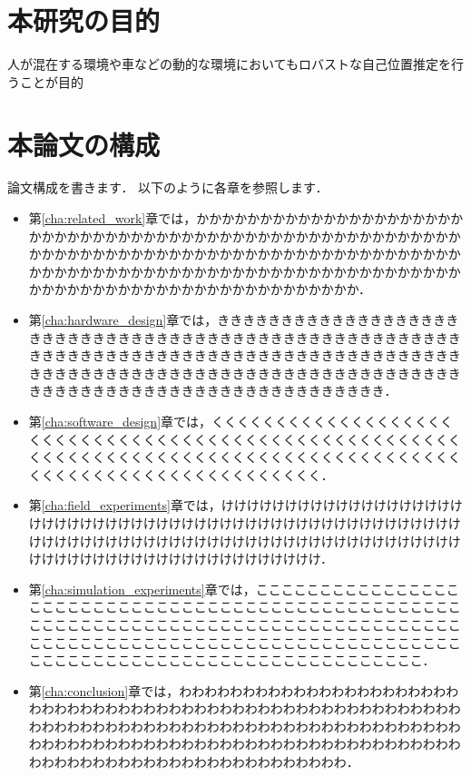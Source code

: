\section{本研究の目的}
\label{sec:objective}
人が混在する環境や車などの動的な環境においてもロバストな自己位置推定を行うことが目的
\section{本論文の構成}
\label{sec:organization}
論文構成を書きます．
以下のように各章を参照します．
\begin{itemize}[label={}, itemsep=0.5\baselineskip]
  \item 第\ref{cha:related_work}章では，かかかかかかかかかかかかかかかかかかかかかかかかかかかかかかかかかかかかかかかかかかかかかかかかかかかかかかかかかかかかかかかかかかかかかかかかかかかかかかかかかかかかかかかかかかかかかかかかかかかかかかかかかかかかかかかかかかかかかかかかかかかかかかかかかかかかかかかかかかかかかかかかかかかかか．
  \item 第\ref{cha:hardware_design}章では，ききききききききききききききききききききききききききききききききききききききききききききききききききききききききききききききききききききききききききききききききききききききききききききききききききききききききききききききききききききききききききききききききききききききききききききききききききききき．
  \item 第\ref{cha:software_design}章では，くくくくくくくくくくくくくくくくくくくくくくくくくくくくくくくくくくくくくくくくくくくくくくくくくくくくくくくくくくくくくくくくくくくくくくくくくくくくくくくくくくくくくくくくくくくくくくくくくくくくくくくくくくくくくく．
  \item 第\ref{cha:field_experiments}章では，けけけけけけけけけけけけけけけけけけけけけけけけけけけけけけけけけけけけけけけけけけけけけけけけけけけけけけけけけけけけけけけけけけけけけけけけけけけけけけけけけけけけけけけけけけけけけけけけけけけけけけけけけけけけけけ．
  \item 第\ref{cha:simulation_experiments}章では，こここここここここここここここここここここここここここここここここここここここここここここここここここここここここここここここここここここここここここここここここここここここここここここここここここここここここここここここここここここここここここここここここここここここここここここここここここここ．
  \item 第\ref{cha:conclusion}章では，わわわわわわわわわわわわわわわわわわわわわわわわわわわわわわわわわわわわわわわわわわわわわわわわわわわわわわわわわわわわわわわわわわわわわわわわわわわわわわわわわわわわわわわわわわわわわわわわわわわわわわわわわわわわわわわわわわわわわわわわわわわわわわわわわわわわわわわわわわわわわわわわわわわわわ．
\end{itemize}